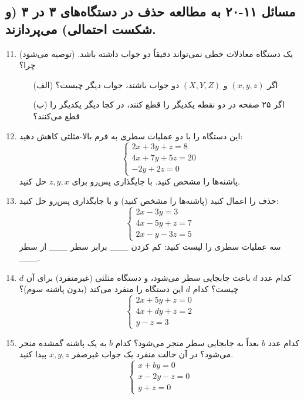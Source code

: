 \documentclass[12pt, a4paper]{book}
\theoremstyle{translator}
\begin{document}
	\subsection*{مسائل ۱۱-۲۰ به مطالعه حذف در دستگاه‌های ۳ در ۳ (و شکست احتمالی) می‌پردازند.}
	\begin{enumerate}
		\setcounter{enumi}{10}
		\item (توصیه می‌شود) یک دستگاه معادلات خطی نمی‌تواند دقیقاً دو جواب داشته باشد. چرا؟
		\begin{itemize}
			\item[(الف)] اگر $(x,y,z)$ و $(X,Y,Z)$ دو جواب باشند، جواب دیگر چیست؟
			\item[(ب)] اگر ۲۵ صفحه در دو نقطه یکدیگر را قطع کنند، در کجا دیگر یکدیگر را قطع می‌کنند؟
		\end{itemize}
		
		\item این دستگاه را با دو عملیات سطری به فرم بالا-مثلثی کاهش دهید:
		\[
		\begin{cases}
			2x + 3y + z = 8 \\
			4x + 7y + 5z = 20 \\
			-2y + 2z = 0
		\end{cases}
		\]
		پاشنه‌ها را مشخص کنید. با جایگذاری پس‌رو برای $z,y,x$ حل کنید.
		
		\item حذف را اعمال کنید (پاشنه‌ها را مشخص کنید) و با جایگذاری پس‌رو حل کنید:
		\[
		\begin{cases}
			2x - 3y = 3 \\
			4x - 5y + z = 7 \\
			2x - y - 3z = 5
		\end{cases}
		\]
		سه عملیات سطری را لیست کنید: کم کردن \_\_\_ برابر سطر \_\_\_ از سطر \_\_\_.
		
		\item کدام عدد $d$ باعث جابجایی سطر می‌شود، و دستگاه مثلثی (غیرمنفرد) برای آن $d$ چیست؟ کدام $d$ این دستگاه را منفرد می‌کند (بدون پاشنه سوم)؟
		\[
		\begin{cases}
			2x + 5y + z = 0 \\
			4x + dy + z = 2 \\
			y - z = 3
		\end{cases}
		\]
		
		\item کدام عدد $b$ بعداً به جابجایی سطر منجر می‌شود؟ کدام $b$ به یک پاشنه گمشده منجر می‌شود؟ در آن حالت منفرد یک جواب غیرصفر $x,y,z$ پیدا کنید.
		\[
		\begin{cases}
			x + by = 0 \\
			x - 2y - z = 0 \\
			y + z = 0
		\end{cases}
		\]
		

\end{enumerate}
\end{document}
